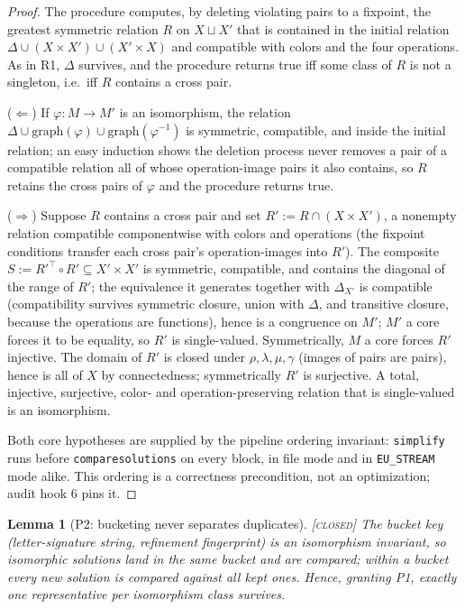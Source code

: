 \documentclass[11pt]{article}
\newtheorem{lemma}[theorem]{Lemma}
\theoremstyle{definition}
\newcommand{\CLOSED}{\textnormal{\textsc{[closed]}}}
\begin{document}
\begin{proof}
The procedure computes, by deleting violating pairs to a fixpoint, the greatest symmetric
relation $R$ on $X \sqcup X'$ that is contained in the initial relation
$\Delta \cup (X \times X') \cup (X' \times X)$ and compatible with colors and the four
operations. As in R1, $\Delta$ survives, and the procedure returns true iff some class of
$R$ is not a singleton, i.e.\ iff $R$ contains a cross pair.

($\Leftarrow$) If $\varphi : M \to M'$ is an isomorphism, the relation
$\Delta \cup \mathrm{graph}(\varphi) \cup \mathrm{graph}(\varphi^{-1})$ is symmetric,
compatible, and inside the initial relation; an easy induction shows the deletion process
never removes a pair of a compatible relation all of whose operation-image pairs it also
contains, so $R$ retains the cross pairs of $\varphi$ and the procedure returns true.

($\Rightarrow$) Suppose $R$ contains a cross pair and set
$R' := R \cap (X \times X')$, a nonempty relation compatible componentwise with colors
and operations (the fixpoint conditions transfer each cross pair's operation-images into
$R'$). The composite $S := R'^{\top} \circ R' \subseteq X' \times X'$ is symmetric,
compatible, and contains the diagonal of the range of $R'$; the equivalence it generates
together with $\Delta_{X'}$ is compatible (compatibility survives symmetric closure,
union with $\Delta$, and transitive closure, because the operations are functions), hence
is a congruence on $M'$; $M'$ a core forces it to be equality, so $R'$ is single-valued.
Symmetrically, $M$ a core forces $R'$ injective. The domain of $R'$ is closed under
$\rho, \lambda, \mu, \gamma$ (images of pairs are pairs), hence is all of $X$ by
connectedness; symmetrically $R'$ is surjective. A total, injective, surjective,
color- and operation-preserving relation that is single-valued is an isomorphism.

Both core hypotheses are supplied by the pipeline ordering invariant:
\texttt{simplify} runs before \texttt{comparesolutions} on every block, in file mode and
in \texttt{EU\_STREAM} mode alike. This ordering is a correctness precondition, not an
optimization; audit hook 6 pins it.
\end{proof}

\begin{lemma}[P2: bucketing never separates duplicates]\label{lem:P2} \CLOSED\;
The bucket key (letter-signature string, refinement fingerprint) is an isomorphism
invariant, so isomorphic solutions land in the same bucket and are compared; within a
bucket every new solution is compared against all kept ones. Hence, granting P1, exactly
one representative per isomorphism class survives.
\end{lemma}
\end{document}
